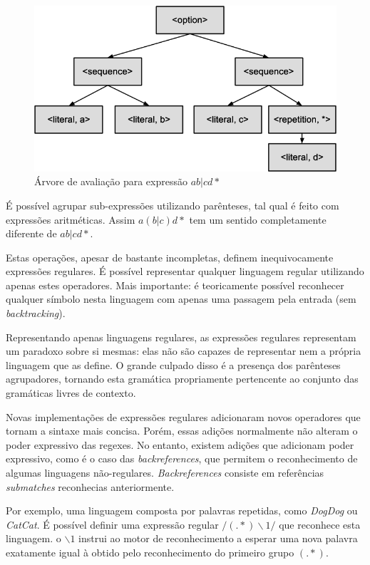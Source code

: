 \documentclass[a4paper,12pt,oneside,onecolumn]{uerj}
\begin{document}
\begin{figure}[ht]
  \centering
  \includegraphics[scale=0.4]{figures/abcd_parse_tree.png}
  \caption{Árvore de avaliação para expressão $ab|cd*$}
  \label{fig:abcd_parse_tree}
\end{figure}

É possível agrupar sub-expressões utilizando parênteses, tal qual é feito com expressões aritméticas. Assim $a(b|c)d*$ tem um sentido completamente diferente de $ab|cd*$.

Estas operações, apesar de bastante incompletas, definem inequivocamente expressões regulares. É possível representar qualquer linguagem regular utilizando apenas estes operadores. Mais importante: é teoricamente possível reconhecer qualquer símbolo nesta linguagem com apenas uma passagem pela entrada (sem \emph{backtracking}). 

Representando apenas linguagens regulares, as expressões regulares representam um paradoxo sobre si mesmas: elas não são capazes de representar nem a própria linguagem que as define. O grande culpado disso é a presença dos parênteses agrupadores, tornando esta gramática propriamente pertencente ao conjunto das gramáticas livres de contexto.

Novas implementações de expressões regulares adicionaram novos operadores que tornam a sintaxe mais concisa. Porém, essas adições normalmente não alteram o poder expressivo das regexes. No entanto, existem adições que adicionam poder expressivo, como é o caso das \emph{backreferences}, que permitem o reconhecimento de algumas linguagens não-regulares. \emph{Backreferences} consiste em referências \emph{submatches} reconhecias anteriormente.

Por exemplo, uma linguagem composta por palavras repetidas, como \emph{DogDog} ou \emph{CatCat}. É possível definir uma expressão regular $/(.*)\backslash 1/$ que reconhece esta linguagem. o $\backslash 1$ instrui ao motor de reconhecimento a esperar uma nova palavra exatamente igual à obtido pelo reconhecimento do primeiro grupo $(.*)$.
\end{document}
